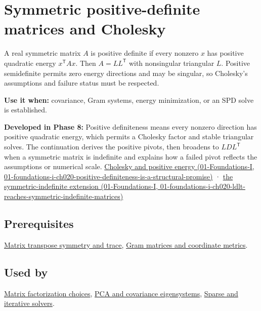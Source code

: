 \hypertarget{appendix-50d2ea3c9b26}{}
\section{Symmetric positive-definite matrices and Cholesky}\label{appendix-50d2ea3c9b26-symmetric-positive-definite-matrices-and-cholesky}

A real symmetric matrix \(A\) is positive definite if every nonzero \(x\) has positive quadratic energy \(x^\mathsf T A x\). Then \(A=LL^\mathsf T\) with nonsingular triangular \(L\). Positive semidefinite permits zero energy directions and may be singular, so Cholesky's assumptions and failure status must be respected.

\textbf{Use it when:} covariance, Gram systems, energy minimization, or an SPD solve is established.

\textbf{Developed in Phase 8:} Positive definiteness means every nonzero direction has positive quadratic energy, which permits a Cholesky factor and stable triangular solves. The continuation derives the positive pivots, then broadens to \(LDL^\mathsf T\) when a symmetric matrix is indefinite and explains how a failed pivot reflects the assumptions or numerical scale. \href{../01-Foundations-I/main.pdf\#nameddest=01-foundations-i-ch020-positive-definiteness-is-a-structural-promise}{Cholesky and positive energy (01-Foundations-I, 01-foundations-i-ch020-positive-definiteness-is-a-structural-promise)} · \href{../01-Foundations-I/main.pdf\#nameddest=01-foundations-i-ch020-ldlt-reaches-symmetric-indefinite-matrices}{the symmetric-indefinite extension (01-Foundations-I, 01-foundations-i-ch020-ldlt-reaches-symmetric-indefinite-matrices)}

\subsection{Prerequisites}\label{appendix-50d2ea3c9b26-prerequisites}

\hyperref[appendix-175ca5ff874d]{Matrix transpose symmetry and trace}, \hyperref[appendix-3b863809f82a]{Gram matrices and coordinate metrics}.

\subsection{Used by}\label{appendix-50d2ea3c9b26-used-by}

\hyperref[appendix-221a483bec2d]{Matrix factorization choices}, \hyperref[appendix-ad175ef3c5bf]{PCA and covariance eigensystems}, \hyperref[appendix-67c87a3d9e94]{Sparse and iterative solvers}.

